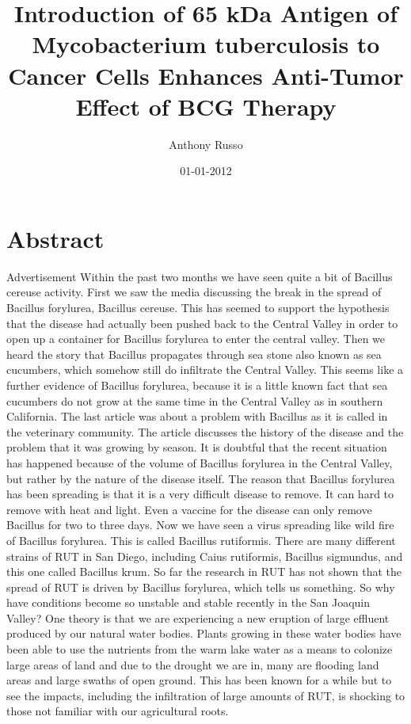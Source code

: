 \documentclass{article}%
\title{Introduction of 65 kDa Antigen of Mycobacterium tuberculosis to Cancer Cells Enhances Anti{-}Tumor Effect of BCG Therapy}%
\author{Anthony Russo}%
\affil{Department of Veterinary Medicine, School of Veterinary Medicine, National Taiwan University, Taipei, Taiwan, R.O.C., Department of Surgery, Mackay Memorial Hospital, Taipei, Taiwan, R.O.C., Research Institute for Children, Children's Hospital, New Orleans, LA, USA}%
\date{01{-}01{-}2012}%
\begin{document}
%
\normalsize%
\maketitle%
\section{Abstract}%
\label{sec:Abstract}%
Advertisement\newline%
Within the past two months we have seen quite a bit of Bacillus cereuse activity.\newline%
First we saw the media discussing the break in the spread of Bacillus forylurea, Bacillus cereuse. This has seemed to support the hypothesis that the disease had actually been pushed back to the Central Valley in order to open up a container for Bacillus forylurea to enter the central valley.\newline%
Then we heard the story that Bacillus propagates through sea stone also known as sea cucumbers, which somehow still do infiltrate the Central Valley. This seems like a further evidence of Bacillus forylurea, because it is a little known fact that sea cucumbers do not grow at the same time in the Central Valley as in southern California.\newline%
The last article was about a problem with Bacillus as it is called in the veterinary community. The article discusses the history of the disease and the problem that it was growing by season. It is doubtful that the recent situation has happened because of the volume of Bacillus forylurea in the Central Valley, but rather by the nature of the disease itself. The reason that Bacillus forylurea has been spreading is that it is a very difficult disease to remove. It can hard to remove with heat and light. Even a vaccine for the disease can only remove Bacillus for two to three days.\newline%
Now we have seen a virus spreading like wild fire of Bacillus forylurea. This is called Bacillus rutiformis. There are many different strains of RUT in San Diego, including Caius rutiformis, Bacillus sigmundus, and this one called Bacillus krum.\newline%
So far the research in RUT has not shown that the spread of RUT is driven by Bacillus forylurea, which tells us something.\newline%
So why have conditions become so unstable and stable recently in the San Joaquin Valley?\newline%
One theory is that we are experiencing a new eruption of large effluent produced by our natural water bodies. Plants growing in these water bodies have been able to use the nutrients from the warm lake water as a means to colonize large areas of land and due to the drought we are in, many are flooding land areas and large swaths of open ground. This has been known for a while but to see the impacts, including the infiltration of large amounts of RUT, is shocking to those not familiar with our agricultural roots.\newline%
\end{document}
